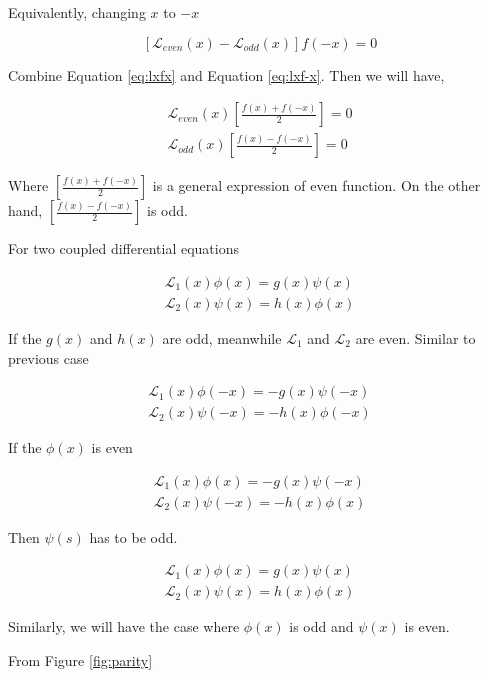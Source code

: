 Equivalently, changing $x$ to $-x$

\begin{equation}
    \left[\mathcal{L}_{even}(x)-\mathcal{L}_{odd}(x)\right]f(-x)=0 
    \label{eq:lxf-x}
\end{equation}

Combine Equation \ref{eq:lxfx} and Equation \ref{eq:lxf-x}. Then we will have,

\begin{eqnarray}
    \mathcal{L}_{even}(x) \left[\frac{f(x) + f(-x)}{2}\right]=0\\
    \mathcal{L}_{odd}(x)  \left[\frac{f(x) - f(-x)}{2}\right]=0
\end{eqnarray}

Where $\left[\frac{f(x) + f(-x)}{2}\right]$ is a general expression of even function. On the other hand, $\left[\frac{f(x) - f(-x)}{2}\right]$ is odd. 

For two coupled differential equations

\begin{eqnarray}
    \mathcal{L}_1(x) \phi(x)=g(x)\psi(x)\\
    \mathcal{L}_2(x) \psi(x)=h(x)\phi(x)
\end{eqnarray}

If the $g(x)$ and $h(x)$ are odd, meanwhile $\mathcal{L}_1$ and $\mathcal{L}_2$ are even. Similar to previous case

\begin{eqnarray}
    \mathcal{L}_1(x) \phi(-x)=-g(x)\psi(-x)\\
    \mathcal{L}_2(x) \psi(-x)=-h(x)\phi(-x)
\end{eqnarray}

If the $\phi(x)$ is even

\begin{eqnarray}
    \mathcal{L}_1(x) \phi(x)=-g(x)\psi(-x)\\
    \mathcal{L}_2(x) \psi(-x)=-h(x)\phi(x)
\end{eqnarray}

Then $\psi(s)$ has to be odd. 

\begin{eqnarray}
    \mathcal{L}_1(x) \phi(x)=g(x)\psi(x)\\
    \mathcal{L}_2(x) \psi(x)=h(x)\phi(x)
\end{eqnarray}

Similarly, we will have the case where $\phi(x)$ is odd and $\psi(x)$ is even. 

From \cite{parity} Figure \ref{fig:parity} 


